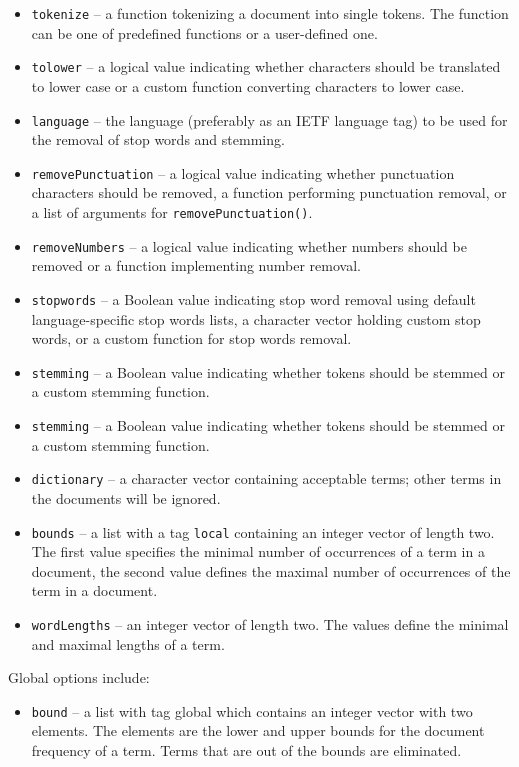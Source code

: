 \begin{itemize}
    \item \texttt{tokenize} – a function tokenizing a document into single tokens. The
function can be one of predefined functions or a user-defined one.
    \item \texttt{tolower} – a logical value indicating whether characters should be translated to lower case or a custom function converting characters to lower
case.
    \item \texttt{language} – the language (preferably as an IETF language tag) to be used
for the removal of stop words and stemming.
    \item \texttt{removePunctuation} – a logical value indicating whether punctuation
characters should be removed, a function performing punctuation removal, or a list of arguments for \texttt{removePunctuation()}.
    \item \texttt{removeNumbers} – a logical value indicating whether numbers should be
removed or a function implementing number removal.
    \item \texttt{stopwords} – a Boolean value indicating stop word removal using default
language-specific stop words lists, a character vector holding custom stop
words, or a custom function for stop words removal.
    \item \texttt{stemming} – a Boolean value indicating whether tokens should be
stemmed or a custom stemming function.
    \item \texttt{stemming} – a Boolean value indicating whether tokens should be
stemmed or a custom stemming function.
    \item \texttt{dictionary} – a character vector containing acceptable terms; other
terms in the documents will be ignored.
    \item \texttt{bounds} – a list with a tag \texttt{local} containing an integer vector of length
two. The first value specifies the minimal number of occurrences of a
term in a document, the second value defines the maximal number of
occurrences of the term in a document.
    \item \texttt{wordLengths} – an integer vector of length two. The values define the
minimal and maximal lengths of a term.
\end{itemize}

Global options include:

\begin{itemize}
    \item \texttt{bound} – a list with tag global which contains an integer vector with two
elements. The elements are the lower and upper bounds for the document
frequency of a term. Terms that are out of the bounds are eliminated.
\end{itemize}


